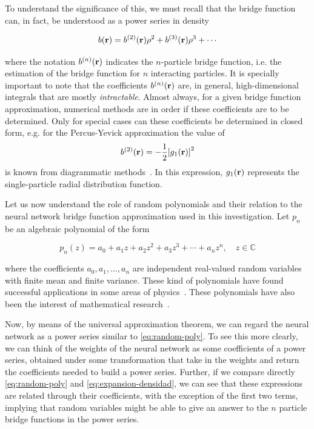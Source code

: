 To understand the significance of this, we must recall that the bridge function can, in 
fact, be understood as a
power series in density~\cite{hansenTheorySimpleLiquids2013}

\begin{equation}
    b(\vecr) = b^{(2)}(\vecr) \rho^2 + b^{(3)}(\vecr) \rho^3 + \cdots
    \label{eq:expansion-densidad}
\end{equation}

where the notation $b^{(n)}(\mathbf{r})$ indicates the $n$-particle bridge function, i.e. the
estimation of the bridge function for $n$ interacting particles. It is specially
important to note that the coefficients $b^{(n)}(\mathbf{r})$ are, in general, high-dimensional
integrals that are mostly \emph{intractable}. Almost always, for a given bridge function
approximation, numerical methods are in order if these coefficients are to be determined.
Only for special cases can these coefficients be determined in closed form, e.g.
for the Percus-Yevick approximation the value of
\[
b^{(2)}(\mathbf{r}) = -\frac{1}{2}{\left[ g_{1}(\mathbf{r}) \right]}^2
\]
is known from diagrammatic methods~\cite{hansenTheorySimpleLiquids2013}. In this
expression, $g_{1}(\mathbf{r})$ represents the single-particle radial distribution function.

Let us now understand the role of random polynomials and their relation to the neural
network bridge function approximation used in this investigation.
Let $p_n$ be an algebraic polynomial of the form

\begin{equation}
    p_n(z) = a_0 + a_1 z + a_2 z^2 + a_3 z^3 + \cdots + a_n z^n, \quad
    z \in \mathbb{C}
    \label{eq:random-poly}
\end{equation}

where the coefficients $a_0, a_1, \dots , a_n$ are independent real-valued random variables
with finite mean and finite variance. These kind of polynomials have found successful
applications in some areas of physics~\cite{houghZerosGaussianAnalytic2009}.
These polynomials have also been the interest of mathematical research~\cite{edelmanHowManyZeros1995}.

Now, by means of the universal approximation theorem, we can regard the neural network
as a power series similar to \autoref{eq:random-poly}. To see this more clearly, we
can think of the weights of the neural network as some coefficients of a power series,
obtained under some transformation that take in the weights and return the coefficients
needed to build a power series.
Further, if we compare directly \autoref{eq:random-poly}
and \autoref{eq:expansion-densidad}, we can see that these expressions
are related through their coefficients, with the exception of the first two terms, implying 
that random variables might be able to give an answer to the $n$ particle bridge functions 
in the power series.

